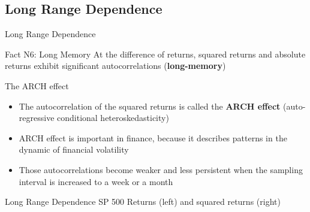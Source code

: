 \documentclass{beamer}
\begin{document}
\subsection{Long Range Dependence}
\begin{frame}{Long Range Dependence}
  \begin{exampleblock}{Fact N6: Long Memory}
    At the difference of returns, squared returns and absolute returns exhibit significant autocorrelations (\textbf{long-memory})
  \end{exampleblock}
  {The ARCH effect}
  \begin{itemize}
  \item The autocorrelation of the squared returns is called the \textbf{ARCH effect} (auto-regressive conditional heteroskedasticity)
  \item ARCH effect is important in finance, because it describes patterns in the dynamic of financial volatility 
  \item Those autocorrelations become weaker and less persistent when the sampling interval is increased to a week or a month
  \end{itemize}
  
\end{frame}


\begin{frame}{Long Range Dependence}
  SP 500 Returns (left) and squared returns (right) \\

\medskip
  
\end{frame}
\end{document}
